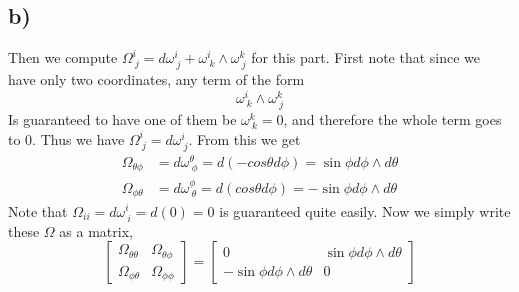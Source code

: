 \documentclass{article}
\theoremstyle{definition}
\begin{document}
\subsection*{b)}
Then we compute $\Omega^i_{\ j} = d\omega^i_{\ j} + \omega^i_{\ k} \wedge \omega^k_{\ j}$
for this part. First note that since we have only two coordinates, any term of the form 
\[
    \omega^i_{\ k} \wedge \omega^{k}_{\ j}
\]
Is guaranteed to have one of them be $\omega^k_{\ k} = 0$, and therefore the whole term
goes to 0. Thus we have $\Omega^i_{\ j} = d\omega^i_{\ j}$. From this we get 
\begin{align*}
    \Omega_{\theta \phi} &= d\omega^\theta_{\ \phi} = d(-cos\theta d\phi) = \sin\phi d\phi \wedge d\theta\\
    \Omega_{\phi \theta} &= d\omega^\phi_{\ \theta} = d(cos \theta d\phi) = -\sin\phi d\phi \wedge d\theta
\end{align*}
Note that $\Omega_{i i} = d\omega^i_{\ i} = d(0) = 0$ is guaranteed quite easily.
 Now we simply write these $\Omega$ as a matrix,
\[
    \begin{bmatrix}
        \Omega_{\theta \theta} &\Omega_{\theta \phi}\\
        \Omega_{\phi \theta} & \Omega_{\phi \phi}
    \end{bmatrix} = \begin{bmatrix}
        0 & \sin\phi d\phi \wedge d\theta \\
        -\sin\phi d\phi \wedge d\theta & 0
    \end{bmatrix}
\]
\end{document}
